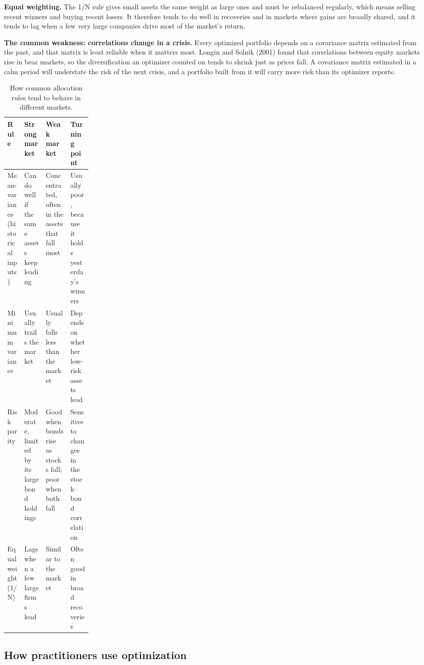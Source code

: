 \textbf{Equal weighting.} The 1/N rule gives small assets the same weight as large ones and must be rebalanced regularly, which means selling recent winners and buying recent losers. It therefore tends to do well in recoveries and in markets where gains are broadly shared, and it tends to lag when a few very large companies drive most of the market's return.

\textbf{The common weakness: correlations change in a crisis.} Every optimized portfolio depends on a covariance matrix estimated from the past, and that matrix is least reliable when it matters most. Longin and Solnik (2001) found that correlations between equity markets rise in bear markets, so the diversification an optimizer counted on tends to shrink just as prices fall. A covariance matrix estimated in a calm period will understate the risk of the next crisis, and a portfolio built from it will carry more risk than its optimizer reports. 

\begin{table}[htbp]
\centering
\small
\caption{How common allocation rules tend to behave in different markets.}
\label{tab:19-regimes}
\begin{tabularx}{0.95\linewidth}{@{}>{\raggedright\arraybackslash}p{0.2\linewidth}>{\raggedright\arraybackslash}X>{\raggedright\arraybackslash}X>{\raggedright\arraybackslash}X@{}}
\toprule
Rule & Strong market & Weak market & Turning point \\
\midrule
Mean-variance (historical inputs) & Can do well if the same assets keep leading & Concentrated, often in the assets that fall most & Usually poor, because it holds yesterday's winners \\
Minimum variance & Usually trails the market & Usually falls less than the market & Depends on whether low-risk assets lead \\
Risk parity & Moderate, limited by its large bond holdings & Good when bonds rise as stocks fall; poor when both fall & Sensitive to changes in the stock--bond correlation \\
Equal weight (1/N) & Lags when a few large firms lead & Similar to the market & Often good in broad recoveries \\
\bottomrule
\end{tabularx}
\end{table}

\subsection{How practitioners use optimization}
\label{sec:19-practice}

